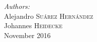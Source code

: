 \begin{titlepage}
\Large \emph{Authors:}\\
Alejandro \textsc{Suárez Hernández}\\ %
Johannes \textsc{Heidecke}\\[3cm] %


{\large November 2016}\\[3cm] %


 

\vspace*{\fill} %

\end{titlepage}
